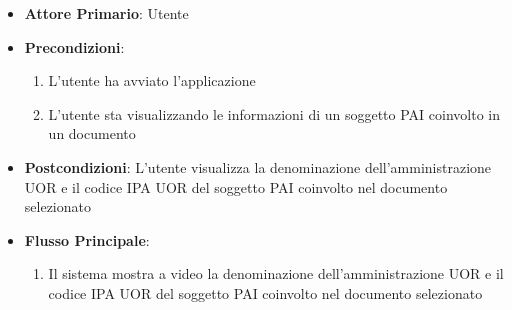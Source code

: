 \begin{itemize}
    \item \textbf{Attore Primario}: Utente
    \item \textbf{Precondizioni}:
    \begin{enumerate}
        \item L'utente ha avviato l'applicazione
        \item L'utente sta visualizzando le informazioni di un soggetto PAI coinvolto in un documento
    \end{enumerate}
    \item \textbf{Postcondizioni}: L'utente visualizza la denominazione dell'amministrazione UOR e il codice IPA UOR del soggetto PAI coinvolto nel documento selezionato
    \item \textbf{Flusso Principale}:
        \begin{enumerate}
            \item Il sistema mostra a video la denominazione dell'amministrazione UOR e il codice IPA UOR del soggetto PAI coinvolto nel documento selezionato
        \end{enumerate}
\end{itemize}

